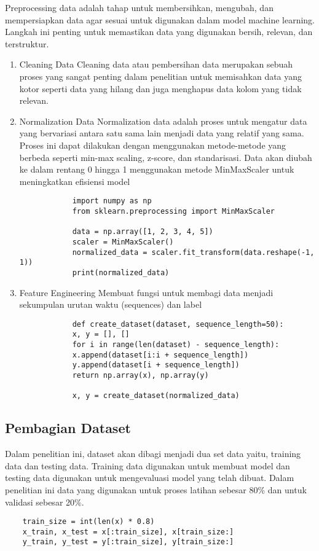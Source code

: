 \begin{subs}
	Preprocessing data adalah tahap untuk membersihkan, mengubah, dan mempersiapkan data agar sesuai untuk digunakan dalam model machine learning. Langkah ini penting untuk memastikan data yang digunakan bersih, relevan, dan terstruktur.
	\begin{enumerate}
		\item Cleaning Data
		      Cleaning data atau pembersihan data merupakan sebuah proses yang sangat penting dalam penelitian untuk memisahkan data yang kotor seperti data yang hilang dan juga menghapus data kolom yang tidak relevan.
		\item Normalization Data
		      Normalization data adalah proses untuk mengatur data yang bervariasi antara satu sama lain menjadi data yang relatif yang sama. Proses ini dapat dilakukan dengan menggunakan metode-metode yang berbeda seperti min-max scaling, z-score, dan standarisasi. Data akan diubah ke dalam rentang 0 hingga 1 menggunakan metode MinMaxScaler untuk meningkatkan efisiensi model
		      \begin{lstlisting}
            import numpy as np
            from sklearn.preprocessing import MinMaxScaler

            data = np.array([1, 2, 3, 4, 5])
            scaler = MinMaxScaler()
            normalized_data = scaler.fit_transform(data.reshape(-1, 1))
            print(normalized_data)
        \end{lstlisting}
		\item Feature Engineering
		      Membuat fungsi untuk membagi data menjadi sekumpulan urutan waktu (sequences) dan label
		      \begin{lstlisting}
            def create_dataset(dataset, sequence_length=50):
            x, y = [], []
            for i in range(len(dataset) - sequence_length):
            x.append(dataset[i:i + sequence_length])
            y.append(dataset[i + sequence_length])
            return np.array(x), np.array(y)

            x, y = create_dataset(normalized_data)
          \end{lstlisting}
	\end{enumerate}

	\subsection{Pembagian Dataset}
	\indent

	Dalam penelitian ini, dataset akan dibagi menjadi dua set data yaitu, training data dan testing data. Training data digunakan untuk membuat model dan testing data digunakan untuk mengevaluasi model yang telah dibuat.
	Dalam penelitian ini data yang digunakan untuk proses latihan sebesar 80\% dan untuk validasi sebesar 20\%.
	\begin{lstlisting}
    train_size = int(len(x) * 0.8)
    x_train, x_test = x[:train_size], x[train_size:]
    y_train, y_test = y[:train_size], y[train_size:]
  \end{lstlisting}


\end{subs}
